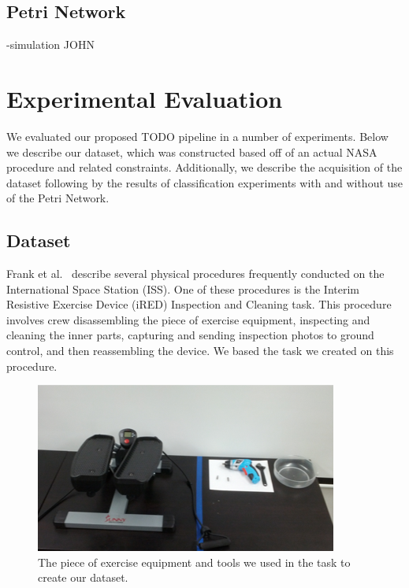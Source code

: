 \documentclass[10pt,twocolumn,letterpaper]{article}
\begin{document}
\subsection{Petri Network}
-simulation
JOHN
\section{Experimental Evaluation}

We evaluated our proposed TODO pipeline in a number of experiments. Below we describe our dataset, which was constructed based off of an actual NASA procedure and related constraints. Additionally, we describe the acquisition of the dataset following by the results of classification experiments with and without use of the Petri Network.

\subsection{Dataset}

Frank et al.~\cite{frank2013autonomous} describe several physical procedures frequently conducted on the International Space Station (ISS). One of these procedures is the Interim Resistive Exercise Device (iRED) Inspection and Cleaning task. This procedure involves crew disassembling the piece of exercise equipment, inspecting and cleaning the inner parts, capturing and sending inspection photos to ground control, and then reassembling the device. We based the task we created on this procedure.

\begin{figure}[!t]
    \centering
    \includegraphics[width=\columnwidth]{fig/equipment.png}
    \caption{The piece of exercise equipment and tools we used in the task to create our dataset.}
    \label{fig:equipment}
\end{figure}
\end{document}
